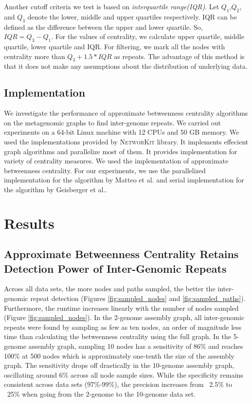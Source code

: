 \documentclass[runningheads,a4paper]{llncs}
\begin{document}
Another cutoff criteria we test is based on \textit{interquartile range(IQR)}. Let $Q_{1}$,$Q_{2}$, and $Q_{3}$ denote the lower, middle and upper quartiles respectively. IQR can be defined as the difference between the upper and lower quartile. So, $IQR = Q_{3} - Q_{1}$. For the values of centrality, we calculate upper quartile, middle quartile, lower quartile and IQR. For filtering, we mark all the nodes with centrality more than $Q_{3} + 1.5*IQR$ as repeats. The advantage of this method is that it does not make any assumptions about the distribution of underlying data. 

\subsection*{Implementation}
We investigate the performance of approximate betweenness centrality algorithms on the metagenomic graphs to find inter-genome repeats. We carried out experiments on a 64-bit Linux machine with 12 CPUs and 50 GB memory. We used the implementations provided by \textsc{NetworKit}\cite{networkit} library. It implements effecient graph algorithms and parallelize most of them. It provides implementation for variety of centrality measures. We used the implementation of approximate betweenness centrality. For our experiments, we use the parallelized implementation for the algorithm by Matteo et al.\cite{matteo} and serial implementation for the algorithm by Geisberger et al.\cite{sanders}.


\section{Results} 


\subsection*{Approximate Betweenness Centrality Retains Detection Power of Inter-Genomic Repeats}

Across all data sets, the more nodes and paths sampled, the better the inter-genomic repeat detection (Figures \ref{fig:sampled_nodes} and \ref{fig:sampled_paths}).
Furthermore, the runtime increases linearly with the number of nodes sampled (Figure \ref{fig:sampled_nodes}).
In the 2-genome assembly graph, all inter-genomic repeats were found by sampling as few as ten nodes, an order of magnitude less time than calculating the betweenness centrality using the full graph.
In the 5-genome assembly graph, sampling 10 nodes has a sensitivity of 86\% and reaches 100\% at 500 nodes which is approximately one-tenth the size of the assembly graph.
The sensitivity drops off drastically in the 10-genome assembly graph, oscillating around 6\% across all node sample sizes.
While the specificity remains consistent across data sets (97\%-99\%), the precision increases from ~2.5\% to ~25\% when going from the 2-genome to the 10-genome data set.
\end{document}
